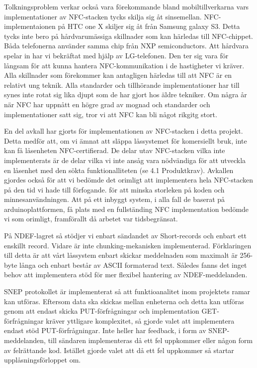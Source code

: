 \documentclass[11pt]{article}
\begin{document}
Tolkningsproblem verkar också vara förekommande bland mobiltillverkarna vars implementationer av NFC-stacken tycks skilja sig åt sinsemellan. NFC-implementaionen på HTC one X skiljer sig åt från Samsung galaxy S3. Detta tycks inte bero på hårdvarumässiga skillnader som kan härledas till NFC-chippet. Båda telefonerna använder samma chip från NXP semiconductors. Att hårdvara spelar in har vi bekräftat med hjälp av LG-telefonen. Den ter sig vara för långsam för att kunna hantera NFC-kommunikation i de hastigheter vi kräver. Alla skillnader som förekommer kan antagligen härledas till att NFC är en relativt ung teknik. Alla standarder och tillhörande implementationer har till synes inte rotat sig lika djupt som de har gjort hos äldre tekniker. Om några år när NFC har uppnått en högre grad av mognad och standarder och implementationer satt sig, tror vi att NFC kan bli något rikgitg stort. 

En del avkall har gjorts för implementationen av NFC-stacken i detta projekt. Detta medför att, om vi ämnat att släppa låssystemet för komersiellt bruk, inte kan få låsenheten NFC-certifierad. De delar utav NFC-stacken vilka inte implementerats är de delar vilka vi inte ansåg vara nödvändiga för att utveckla en låsenhet med den sökta funktionalliteten (se 4.1 Produktkrav). Avkallen gjordes också för att vi bedömde det orimligt att implementera hela NFC-stacken på den tid vi hade till förfogande. för att minska storleken på koden och minnesanvändningen. Att på ett inbyggt system, i alla fall de baserat på arduinoplattformen, få plats med en fullständing NFC implementation bedömde vi som orimligt, framförallt då arbetet var tidsbegränsat. 

På NDEF-lagret så stödjer vi enbart sändandet av Short-records och enbart ett enskillt record. Vidare är inte chunking-mekanisken implementerad. Förklaringen till detta är att vårt låssystem enbart skickar meddelnaden som maximalt är 256-byte långa och enbart består av ASCII formaterad text. Således fanns det inget behov att implementera stöd för mer flexibel hantering av NDEF-meddelanden. 

SNEP protokollet är implementerat så att funktioanalitet inom projektets ramar kan utföras. Eftersom data ska skickas mellan enheterna och detta kan utföras genom att endast skicka PUT-förfrågningar och implementation GET-förfrågningar kräver yttligare komplexitet, så gjorde valet att implementera endast stöd PUT-förfrågningar. Inte heller har feedback, i form av SNEP-meddelanden, till sändaren implementeras då ett fel uppkommer eller någon form av felrättande kod. Istället gjorde valet att då ett fel uppkommer så startar upplåsningsförloppet om.
\end{document}
